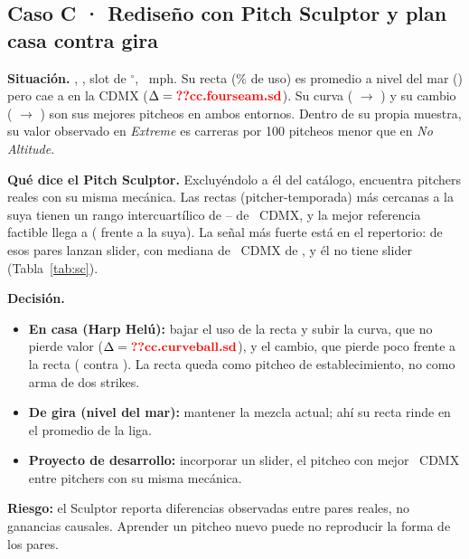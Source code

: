 \documentclass[10pt]{article}
\begin{document}
\subsection*{Caso C · Rediseño con Pitch Sculptor y plan casa contra gira}

\textbf{Situación.} , , slot de $^\circ$, ~mph. Su recta (\% de uso) es promedio a nivel del mar () pero cae a  en la CDMX ($\Delta=\cf{cc.fourseam.sd}$). Su curva ( $\to$ ) y su cambio ( $\to$ ) son sus mejores pitcheos en ambos entornos. Dentro de su propia muestra, su valor observado en \emph{Extreme} es  carreras por 100 pitcheos menor que en \emph{No Altitude}.

\begin{table}[H]\centering\small
\caption{Caso C: arsenal .}\label{tab:cc}
\end{table}

\textbf{Qué dice el Pitch Sculptor.} Excluyéndolo a él del catálogo, encuentra  pitchers reales con su misma mecánica. Las  rectas (pitcher-temporada) más cercanas a la suya tienen un rango intercuartílico de -- de \splus\ CDMX, y la mejor referencia factible llega a  ( frente a la suya). La señal más fuerte está en el repertorio:  de esos pares lanzan slider, con mediana de \splus\ CDMX de , y él no tiene slider (Tabla~\ref{tab:sc}).

\begin{table}[H]\centering\small
\caption{Caso C: qué lanzan los pares factibles y cuánto rinde en la CDMX.}\label{tab:sc}
\end{table}

\textbf{Decisión.}
\begin{itemize}
  \item \textbf{En casa (Harp Helú):} bajar el uso de la recta y subir la curva, que no pierde valor ($\Delta=\cf{cc.curveball.sd}$), y el cambio, que pierde poco frente a la recta ( contra ). La recta queda como pitcheo de establecimiento, no como arma de dos strikes.
  \item \textbf{De gira (nivel del mar):} mantener la mezcla actual; ahí su recta rinde en el promedio de la liga.
  \item \textbf{Proyecto de desarrollo:} incorporar un slider, el pitcheo con mejor \splus\ CDMX entre pitchers con su misma mecánica.
\end{itemize}
\textbf{Riesgo:} el Sculptor reporta diferencias observadas entre pares reales, no ganancias causales. Aprender un pitcheo nuevo puede no reproducir la forma de los pares.
\end{document}
